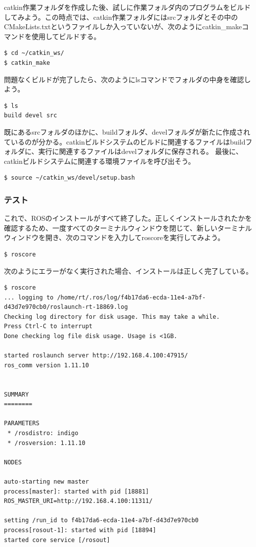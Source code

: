 catkin作業フォルダを作成した後、試しに作業フォルダ内のプログラムをビルドしてみよう。この時点では、catkin作業フォルダにはsrcフォルダとその中のCMakeLists.txtというファイルしか入っていないが、次のようにcatkin\_makeコマンドを使用してビルドする。

\begin{lstlisting}[language=ROS]
$ cd ~/catkin_ws/
$ catkin_make
\end{lstlisting}

問題なくビルドが完了したら、次のようにlsコマンドでフォルダの中身を確認しよう。

\begin{lstlisting}[language=ROS]
$ ls
build devel src
\end{lstlisting}

既にあるsrcフォルダのほかに、buildフォルダ、develフォルダが新たに作成されているのが分かる。catkinビルドシステムのビルドに関連するファイルはbuildフォルダに、実行に関連するファイルはdevelフォルダに保存される。
最後に、catkinビルドシステムに関連する環境ファイルを呼び出そう。

\begin{lstlisting}[language=ROS]
$ source ~/catkin_ws/devel/setup.bash
\end{lstlisting}

\subsubsection{テスト}
これで、ROSのインストールがすべて終了した。正しくインストールされたかを確認するため、一度すべてのターミナルウィンドウを閉じて、新しいターミナルウィンドウを開き、次のコマンドを入力してroscoreを実行してみよう。

\begin{lstlisting}[language=ROS]
$ roscore
\end{lstlisting}

次のようにエラーがなく実行された場合、インストールは正しく完了している。

\begin{lstlisting}[language=ROS]
$ roscore
... logging to /home/rt/.ros/log/f4b17da6-ecda-11e4-a7bf-d43d7e970cb0/roslaunch-rt-18869.log
Checking log directory for disk usage. This may take a while.
Press Ctrl-C to interrupt
Done checking log file disk usage. Usage is <1GB.

started roslaunch server http://192.168.4.100:47915/
ros_comm version 1.11.10


SUMMARY
========

PARAMETERS
 * /rosdistro: indigo
 * /rosversion: 1.11.10

NODES

auto-starting new master
process[master]: started with pid [18881]
ROS_MASTER_URI=http://192.168.4.100:11311/

setting /run_id to f4b17da6-ecda-11e4-a7bf-d43d7e970cb0
process[rosout-1]: started with pid [18894]
started core service [/rosout]
\end{lstlisting}


